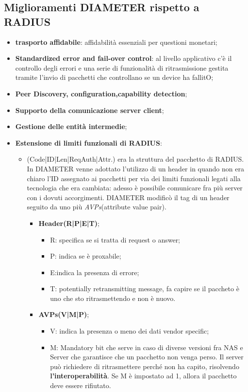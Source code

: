 \documentclass{article}
\theoremstyle{remark}
\begin{document}
\subsection{Miglioramenti DIAMETER rispetto a RADIUS}
\begin{itemize}
    \item \textbf{trasporto affidabile}: affidabilità essenziali per questioni monetari;
    \item \textbf{Standardized error and fail-over control}: al livello applicativo c'è il controllo degli errori e una serie di funzionalità di ritrasmissione gestita tramite l'invio di pacchetti che controllano se un device ha fallitO;
    \item\textbf{Peer Discovery, configuration,capability detection};
    \item \textbf{Supporto della comunicazione server client};
    \item \textbf{Gestione delle entità intermedie};
    \item\textbf{Estensione di limiti funzionali di RADIUS}:\begin{itemize}
        \item (Code|ID|Len|ReqAuth|Attr.) era la struttura del pacchetto di RADIUS. In DIAMETER venne adottato l'utilizzo di un header in quando non era chiaro l'ID assegnato ai pacchetti per via dei limiti funzionali legati alla tecnologia che era cambiata: adesso è possibile comunicare fra più server con i dovuti accorgimenti. DIAMETER modificò il tag di un header seguito da uno più \emph{AVPs}(attribute value pair).
        \begin{itemize}
            \item \textbf{Header(R|P|E|T)};\begin{itemize}
                \item R: specifica se si tratta di request o answer;
                \item P: indica se è proxabile;
                \item E:indica la presenza di errore;
                \item T: potentially retransmitting message, fa capire se il paccheto è uno che sto ritrasmettendo e non è nuovo.
            \end{itemize}
            \item \textbf{AVPs(V|M|P)};\begin{itemize}
                \item V: indica la presenza o meno dei dati vendor specific;
                \item M: Mandatory bit che serve in caso di diverse versioni fra NAS e Server che garantisce che un pacchetto non venga perso. Il server può richiedere di ritrasmettere perché non ha capito, risolvendo \textbf{l'interoperabilità}. Se M è impostato ad 1, allora il pacchetto deve essere rifiutato.

\end{itemize}
\end{itemize}
\end{itemize}
\end{itemize}
\end{document}
